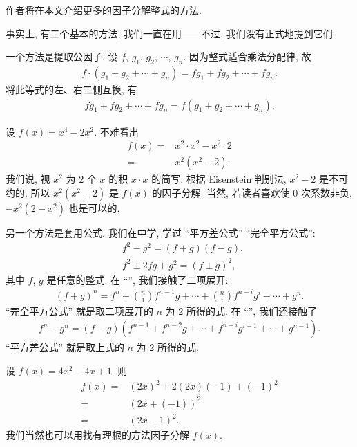作者将在本文介绍更多的因子分解整式的方法.

事实上, 有二个基本的方法, 我们一直在用——不过, 我们没有正式地提到它们.

一个方法是提取公因子. 设 $f$, $g_1$, $g_2$, $\cdots$, $g_n$. 因为整式适合乘法分配律, 故
\begin{align*}
    f \cdot (g_1 + g_2 + \cdots + g_n) = fg_1 + fg_2 + \cdots + fg_n.
\end{align*}
将此等式的左、右二侧互换, 有
\begin{align*}
    fg_1 + fg_2 + \cdots + fg_n = f(g_1 + g_2 + \cdots + g_n).
\end{align*}

\begin{example}
    设 $f(x) = x^4 - 2x^2$. 不难看出
    \begin{align*}
        f(x)
        = {} & x^2 \cdot x^2 - x^2 \cdot 2 \\
        = {} & x^2 (x^2 - 2).
    \end{align*}
    我们说, 视 $x^2$ 为 $2$ 个 $x$ 的积 $x \cdot x$ 的简写. 根据 Eisenstein 判别法, $x^2 - 2$ 是不可约的. 所以 $x^2 (x^2 - 2)$ 是 $f(x)$ 的因子分解. 当然, 若读者喜欢使 $0$ 次系数非负, $-x^2 (2 - x^2)$ 也是可以的.
\end{example}

另一个方法是套用公式. 我们在中学, 学过 ``平方差公式'' ``完全平方公式'':
\begin{align*}
     & f^2 - g^2 = (f + g) (f - g),      \\
     & f^2 \pm 2 fg + g^2 = (f \pm g)^2,
\end{align*}
其中 $f$, $g$ 是任意的整式. 在 ``\GeneralizedBinomialCoefficients'', 我们接触了二项展开:
\begin{align*}
    (f + g)^n = f^n + \binom{n}{1} f^{n-1} g + \cdots + \binom{n}{i} f^{n-i} g^i + \cdots + g^n.
\end{align*}
``完全平方公式'' 就是取二项展开的 $n$ 为 $2$ 所得的式. 在 ``\SyntheticDivision'', 我们还接触了
\begin{align*}
    f^n - g^n = (f - g)(f^{n-1} + f^{n-2} g + \cdots + f^{n-i} g^{i-1} + \cdots + g^{n-1}).
\end{align*}
``平方差公式'' 就是取上式的 $n$ 为 $2$ 所得的式.

\begin{example}
    设 $f(x) = 4x^2 - 4x + 1$. 则
    \begin{align*}
        f(x)
        = {} & (2x)^2 + 2 (2x) (-1) + (-1)^2 \\
        = {} & (2x + (-1))^2                 \\
        = {} & (2x - 1)^2.
    \end{align*}
    我们当然也可以用找有理根的方法因子分解 $f(x)$.
\end{example}

